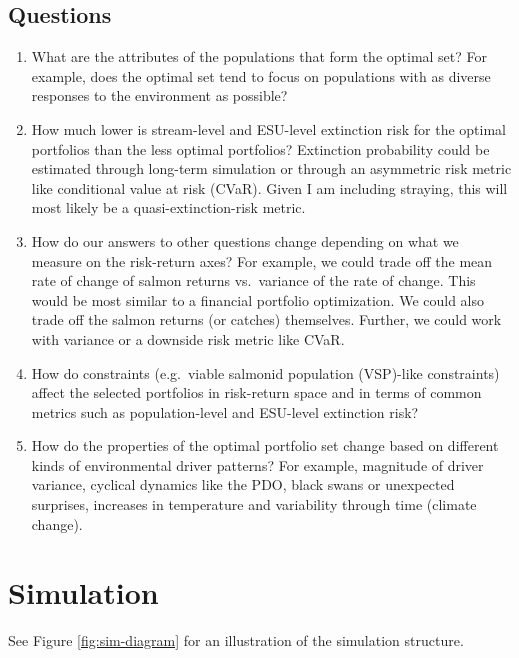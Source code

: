 \documentclass[12pt]{article}
\begin{document}
\subsection{Questions}

\begin{enumerate}
\def\labelenumi{\arabic{enumi}.}
\item
  What are the attributes of the populations that form the optimal set?
  For example, does the optimal set tend to focus on populations with as
  diverse responses to the environment as possible?
\item
  How much lower is stream-level and ESU-level extinction risk for the
  optimal portfolios than the less optimal portfolios? Extinction
  probability could be estimated through long-term simulation or through
  an asymmetric risk metric like conditional value at risk (CVaR). Given
  I am including straying, this will most likely be a
  quasi-extinction-risk metric.
\item
  How do our answers to other questions change depending on what we
  measure on the risk-return axes? For example, we could trade off the
  mean rate of change of salmon returns vs.~variance of the rate of
  change. This would be most similar to a financial portfolio
  optimization. We could also trade off the salmon returns (or catches)
  themselves. Further, we could work with variance or a downside risk
  metric like CVaR.
\item
  How do constraints (e.g.~viable salmonid population (VSP)-like
  constraints) affect the selected portfolios in risk-return space and
  in terms of common metrics such as population-level and ESU-level
  extinction risk?
\item
  How do the properties of the optimal portfolio set change based on
  different kinds of environmental driver patterns? For example,
  magnitude of driver variance, cyclical dynamics like the PDO, black
  swans or unexpected surprises, increases in temperature and
  variability through time (climate change).
\end{enumerate}

\section{Simulation}

See Figure \ref{fig:sim-diagram} for an illustration of the simulation
structure.
\end{document}
